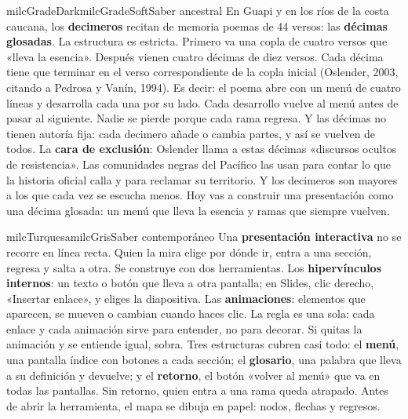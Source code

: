 \documentclass[11pt,letterpaper]{article}
\begin{document}
\begin{softbox}{milcGradeDark}{milcGradeSoft}{Saber ancestral}
En Guapi y en los ríos de la costa caucana, los \textbf{decimeros} recitan de memoria poemas de 44 versos: las \textbf{décimas glosadas}. La estructura es estricta. Primero va una copla de cuatro versos que «lleva la esencia». Después vienen cuatro décimas de diez versos. Cada décima tiene que terminar en el verso correspondiente de la copla inicial (Oslender, 2003, citando a Pedrosa y Vanín, 1994). Es decir: el poema abre con un menú de cuatro líneas y desarrolla cada una por su lado. Cada desarrollo vuelve al menú antes de pasar al siguiente. Nadie se pierde porque cada rama regresa. Y las décimas no tienen autoría fija: cada decimero añade o cambia partes, y así se vuelven de todos. La \textbf{cara de exclusión}: Oslender llama a estas décimas «discursos ocultos de resistencia». Las comunidades negras del Pacífico las usan para contar lo que la historia oficial calla y para reclamar su territorio. Y los decimeros son mayores a los que cada vez se escucha menos. Hoy vas a construir una presentación como una décima glosada: un menú que lleva la esencia y ramas que siempre vuelven.\par{}
\end{softbox}

\begin{softbox}{milcTurquesa}{milcGris}{Saber contemporáneo}
Una \textbf{presentación interactiva} no se recorre en línea recta. Quien la mira elige por dónde ir, entra a una sección, regresa y salta a otra. Se construye con dos herramientas. Los \textbf{hipervínculos internos}: un texto o botón que lleva a otra pantalla; en Slides, clic derecho, «Insertar enlace», y eliges la diapositiva. Las \textbf{animaciones}: elementos que aparecen, se mueven o cambian cuando haces clic. La regla es una sola: cada enlace y cada animación sirve para entender, no para decorar. Si quitas la animación y se entiende igual, sobra. Tres estructuras cubren casi todo: el \textbf{menú}, una pantalla índice con botones a cada sección; el \textbf{glosario}, una palabra que lleva a su definición y devuelve; y el \textbf{retorno}, el botón «volver al menú» que va en todas las pantallas. Sin retorno, quien entra a una rama queda atrapado. Antes de abrir la herramienta, el mapa se dibuja en papel: nodos, flechas y regresos.
\end{softbox}
\end{document}
